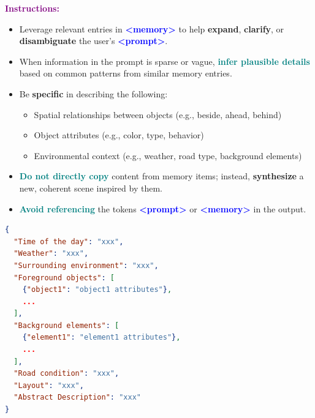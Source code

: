 \begin{tcolorbox}[myboxstyle]
\vspace{1ex}
\noindent\textbf{\textcolor{purple}{Instructions:}}
\begin{itemize}[leftmargin=10pt]
  \item Leverage relevant entries in \textbf{\textcolor{blue}{<memory>}} to help \textbf{\textcolor{blue!80!black}{expand}}, \textbf{\textcolor{blue!80!black}{clarify}}, or \textbf{\textcolor{blue!80!black}{disambiguate}} the user's \textbf{\textcolor{blue}{<prompt>}}.
  \item When information in the prompt is sparse or vague, \textbf{\textcolor{teal}{infer plausible details}} based on common patterns from similar memory entries.
  \item Be \textbf{\textcolor{blue!80!black}{specific}} in describing the following:
    \begin{itemize}
        \item \textcolor{teal!60!black}{Spatial relationships} between objects (e.g., beside, ahead, behind)
        \item \textcolor{teal!60!black}{Object attributes} (e.g., color, type, behavior)
        \item \textcolor{teal!60!black}{Environmental context} (e.g., weather, road type, background elements)
    \end{itemize}
  \item \textbf{\textcolor{teal}{Do not directly copy}} content from memory items; instead, \textbf{\textcolor{teal!80!black}{synthesize}} a new, coherent scene inspired by them.
  \item \textbf{\textcolor{teal}{Avoid referencing}} the tokens \textbf{\textcolor{blue}{<prompt>}} or \textbf{\textcolor{blue}{<memory>}} in the output.
\end{itemize}


\vspace{1ex}
\begin{tcolorbox}[myjsonbox, title=Expected Output Structure (JSON):]
\vspace{-3mm}
\begin{lstlisting}[language=json, basicstyle=\scriptsize\ttfamily, frame=none]
{
  "Time of the day": "xxx",
  "Weather": "xxx",
  "Surrounding environment": "xxx",
  "Foreground objects": [
    {"object1": "object1 attributes"},
    ...
  ],
  "Background elements": [
    {"element1": "element1 attributes"},
    ...
  ],
  "Road condition": "xxx",
  "Layout": "xxx",
  "Abstract Description": "xxx"
}
\end{lstlisting}
\vspace{-3mm}
\end{tcolorbox}



\end{tcolorbox}
